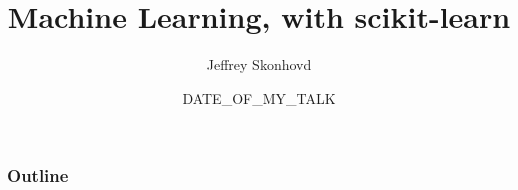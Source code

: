 \documentclass[t]{beamer}
\title{Machine Learning, with scikit-learn}
\author{Jeffrey Skonhovd}
\institute{Georgia Institute of technology}
\date{DATE_OF_MY_TALK}
\begin{document}
\begin{frame}
\titlepage
\end{frame}

\begin{frame}
\frametitle{Outline}
\tableofcontents
\end{frame}


\end{document}
